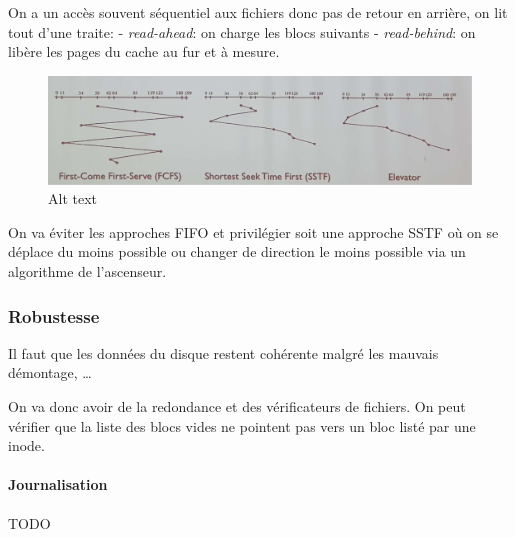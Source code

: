 On a un accès souvent séquentiel aux fichiers donc pas de retour en
arrière, on lit tout d'une traite: - \emph{read-ahead}: on charge les
blocs suivants - \emph{read-behind}: on libère les pages du cache au fur
et à mesure.

\begin{figure}
\centering
\includegraphics{Drawboard-PDF-Annotation-Copy.png}
\caption{Alt text}
\end{figure}

On va éviter les approches FIFO et privilégier soit une approche SSTF où
on se déplace du moins possible ou changer de direction le moins
possible via un algorithme de l'ascenseur.

\subsubsection{Robustesse}\label{robustesse}

Il faut que les données du disque restent cohérente malgré les mauvais
démontage, \ldots{}

On va donc avoir de la redondance et des vérificateurs de fichiers. On
peut vérifier que la liste des blocs vides ne pointent pas vers un bloc
listé par une inode.

\paragraph{Journalisation}\label{journalisation}

TODO
